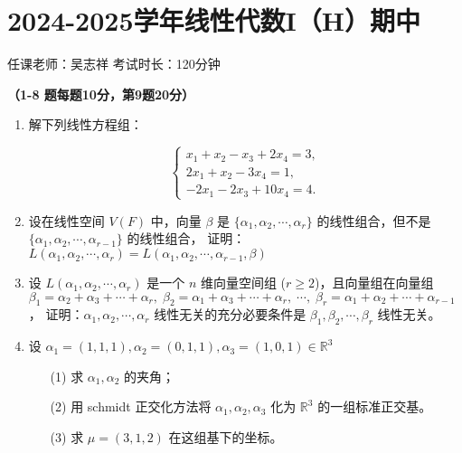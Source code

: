 \section*{2024-2025学年线性代数I（H）期中}

\begin{center}
    任课老师：吴志祥\hspace{4em} 考试时长：120分钟
\end{center}

\bf{（1-8 题每题10分，第9题20分）}

\begin{enumerate}
    \item 解下列线性方程组：

    \[
        \begin{cases}
        x_1 + x_2 - x_3 + 2x_4 = 3, \\
        2x_1 + x_2 - 3x_4 = 1, \\
        -2x_1 - 2x_3 + 10x_4 = 4.
        \end{cases}
    \]

    \item 设在线性空间 \(V(F)\) 中，向量 \(\beta\) 是 \(\{\alpha_1,\alpha_2,\cdots,\alpha_r\}\) 的线性组合，但不是 \(\{\alpha_1,\alpha_2,\cdots,\alpha_{r-1}\}\) 的线性组合，
    证明：\(L(\alpha_1,\alpha_2,\cdots,\alpha_r)=L(\alpha_1,\alpha_2,\cdots,\alpha_{r-1},\beta)\)

    \item 设 \(L(\alpha_1,\alpha_2,\cdots,\alpha_r)\) 是一个 \(n\) 维向量空间组 (\(r\geq2\))，且向量组在向量组
    \(
    \beta_1 = \alpha_2 + \alpha_3 + \cdots + \alpha_r, \;
    \beta_2 = \alpha_1 + \alpha_3 + \cdots + \alpha_r, \;
    \cdots ,\;
    \beta_r = \alpha_1 + \alpha_2 + \cdots + \alpha_{r-1}
    \)，
    证明：\(\alpha_1,\alpha_2,\cdots,\alpha_r\) 线性无关的充分必要条件是 \(\beta_1,\beta_2,\cdots,\beta_r\) 线性无关。

    \item 设 \(\alpha_1=(1,1,1),\alpha_2=(0,1,1),\alpha_3=(1,0,1)\in\mathbb{R}^3\)
    \begin{enumerate}
        \item[(1)] 求 \(\alpha_1,\alpha_2\) 的夹角；
        \item[(2)] 用 schmidt 正交化方法将 \(\alpha_1,\alpha_2,\alpha_3\) 化为 \(\mathbb{R}^3\) 的一组标准正交基。
        \item[(3)] 求 \(\mu=(3,1,2)\) 在这组基下的坐标。
    \end{enumerate}


\end{enumerate}

